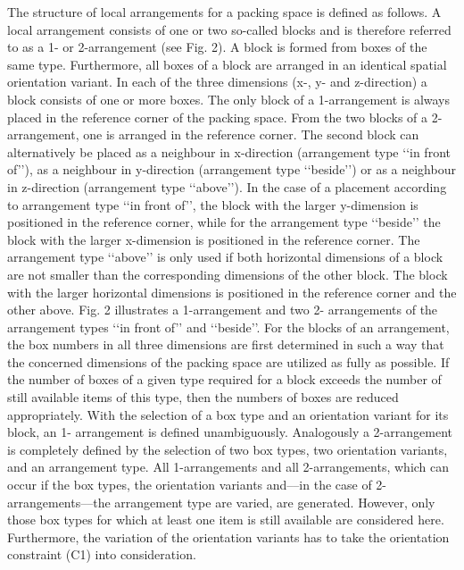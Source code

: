 

The structure of local arrangements for a packing space is defined as follows.
A local arrangement consists of one or two so-called blocks and is therefore referred
to as a 1- or 2-arrangement (see Fig. 2). A block is formed from boxes of
the same type. Furthermore, all boxes of a block are arranged in an identical spatial
orientation variant. In each of the three dimensions (x-, y- and z-direction) a block
consists of one or more boxes.
The only block of a 1-arrangement is always placed in the reference corner of the
packing space. From the two blocks of a 2-arrangement, one is arranged in the
reference corner. The second block can alternatively be placed as a neighbour in
x-direction (arrangement type ‘‘in front of’’), as a neighbour in y-direction (arrangement
type ‘‘beside’’) or as a neighbour in z-direction (arrangement type ‘‘above’’). In
the case of a placement according to arrangement type ‘‘in front of’’, the block with
the larger y-dimension is positioned in the reference corner, while for the arrangement
type ‘‘beside’’ the block with the larger x-dimension is positioned in the reference
corner. The arrangement type ‘‘above’’ is only used if both horizontal
dimensions of a block are not smaller than the corresponding dimensions of the
other block. The block with the larger horizontal dimensions is positioned in the reference
corner and the other above. Fig. 2 illustrates a 1-arrangement and two 2-
arrangements of the arrangement types ‘‘in front of’’ and ‘‘beside’’.
For the blocks of an arrangement, the box numbers in all three dimensions are
first determined in such a way that the concerned dimensions of the packing space
are utilized as fully as possible. If the number of boxes of a given type required
for a block exceeds the number of still available items of this type, then the numbers
of boxes are reduced appropriately.
With the selection of a box type and an orientation variant for its block, an 1-
arrangement is defined unambiguously. Analogously a 2-arrangement is completely
defined by the selection of two box types, two orientation variants, and an arrangement
type. All 1-arrangements and all 2-arrangements, which can occur if the box
types, the orientation variants and––in the case of 2-arrangements––the arrangement
type are varied, are generated. However, only those box types for which at least one
item is still available are considered here. Furthermore, the variation of the orientation
variants has to take the orientation constraint (C1) into consideration.




